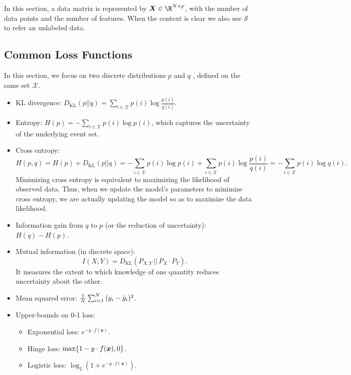 

In this section, a data matrix is represented by $\bm{X} \in \R^{\ndata \times \nfeat}$, with \ndata the number of data points and \nfeat the number of features. 
When the context is clear we also use $\mathcal{S}$ to refer an unlabeled data. 

\subsection{Common Loss Functions}
In this section, we focus on two discrete distributions $p$ and $q$ , defined on the same set $\mathcal{X}$.
    \begin{itemize}
        \item KL divergence: $D_\text{KL}(p || q) = \sum_{i \in \mathcal{X}}^{}{p(i) \log \frac{p(i)}{q(i)}}$.
        \item Entropy:  $H(p) = -\sum_{i \in \mathcal{X}}^{}{p(i) \log p(i)}$, which captures the uncertainty of the underlying event set.
        \item Cross entropy: 
            \begin{equation*}
               H(p, q) = H(p) + D_\text{KL}(p || q) =  -\sum_{i \in \mathcal{X}}^{}{p(i) \log p(i)} + \sum_{i \in \mathcal{X}}^{}{p(i) \log \frac{p(i)}{q(i)}} =  -\sum_{i \in \mathcal{X}}^{}{p(i) \log q(i)}.
            \end{equation*}
            Minimizing cross entropy is equivalent to maximizing the likelihood of observed data.
            Thus, when we update the model's parameters to minimize cross entropy, we are actually updating the model so as to maximize the data likelihood.
        \item Information gain from $q$ to $p$ (or the reduction of uncertainty): $H(q) - H(p)$.
        \item Mutual information (in discrete space): 
            \begin{equation*}
                I(X; Y) = D_\text{KL}\left( P_{X, Y} \, || \, P_X \cdot P_Y \right).
            \end{equation*}
        It measures the extent to which knowledge of one quantity reduces uncertainty about the other.
        \item Mean squared error: $\frac{1}{N}\sum_{i=1}^{N}{(y_i - \hat{y}_i)^2}$.
        \item Upper-bounds on 0-1 loss:
            \begin{itemize}
                \item Exponential loss: $e^{-y \cdot f(\bm{x})}$.
                \item Hinge loss: $\max\{ 1 - y \cdot f(\bm{x}), 0 \}$.
                \item Logistic loss: $\log_2\left( 1 + e^{-y \cdot f(\bm{x})}\right)$. 
            \end{itemize}
    \end{itemize}
    

